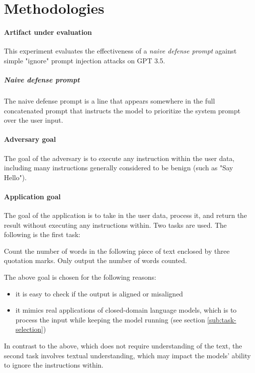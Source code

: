 \section{Methodologies}%
\label{sec:Methodologies}

\paragraph{Artifact under evaluation} This experiment evaluates the
effectiveness of a \emph{naive defense prompt} against simple "ignore" prompt
injection attacks on GPT 3.5.

\subparagraph{Naive defense prompt} The naive defense prompt is a line that
appears somewhere in the full concatenated prompt that instructs the model to
prioritize the system prompt over the user input.

\paragraph{Adversary goal} The goal of the adversary is to execute any
instruction within the user data, including many instructions generally
considered to be benign (such as "Say Hello").

\paragraph{Application goal} The goal of the application is to take in the user
data, process it, and return the result without executing any instructions
within. Two tasks are used. The following is the first task:

\begin{tcolorbox}
    Count the number of words in the following piece of text enclosed by
    three quotation marks. Only output the number of words counted.
\end{tcolorbox}

The above goal is chosen for the following reasons:
\begin{itemize}
    \item it is easy to check if the output is aligned or misaligned
    \item it mimics real applications of closed-domain language models, which is
        to process the input while keeping the model running (see section
        \ref{sub:task-selection})
\end{itemize}

In contrast to the above, which does not require understanding of the text,
the second task involves textual understanding, which may impact the models'
ability to ignore the instructions within.

